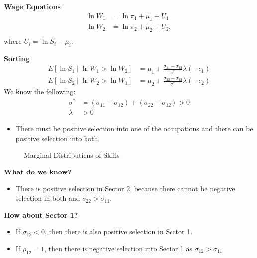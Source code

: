 \begin{frame}
	\textbf{Wage Equations}
	\begin{align*}
	\ln W_1 & = \ln \pi_1 + \mu_1 + U_1 \\
	\ln W_2 & = \ln \pi_2 + \mu_2 + U_2, \\
	\end{align*}
	where $U_i = \ln S_i - \mu_i$.
\end{frame}
\begin{frame}
	\textbf{Sorting}
	\begin{align*}
	E[\ln S_1 \mid \ln W_1 > \ln W_2] & = \mu_1 + \frac{\sigma_{11} - \sigma_{12}}{\sigma^*} \lambda(-c_1) \\
	E[\ln S_2 \mid \ln W_2 > \ln W_1] & = \mu_2 + \frac{\sigma_{22} - \sigma_{12}}{\sigma^*} \lambda(-c_2)
	\end{align*}
	We know the following:
	\begin{align*}
	\sigma^* & = (\sigma_{11} - \sigma_{12}) +  (\sigma_{22} - \sigma_{12}) > 0 \\
	\lambda &> 0
	\end{align*}
	\begin{itemize}\setlength\itemsep{1em}
		\item There must be positive selection into one of the occupations and there can be positive selection into both.
	\end{itemize}	
\end{frame}
\begin{frame}
	\begin{figure}[htp]\centering
		\caption{Marginal Distributions of Skills}\label{Marginal Distributions of Skills}
	\end{figure}
\end{frame}
\begin{frame}
	\textbf{What do we know?}
	\begin{itemize}\setlength\itemsep{1em}
		\item There is positive selection in Sector 2, because there cannot be negative selection in both and $\sigma_{22} > \sigma_{11}$.
	\end{itemize}\medskip
	\textbf{How about Sector 1?}
	\begin{itemize}\setlength\itemsep{1em}
		\item If $\sigma_{12} < 0$, then there is also positive selection in Sector 1.
		\item If $\rho_{12} = 1$, then there is negative selection into Sector 1 as $\sigma_{12} > \sigma_{11}$
	\end{itemize}
\end{frame}
